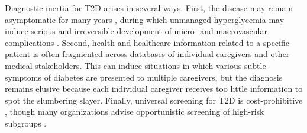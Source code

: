 Diagnostic inertia for T2D arises in several ways. First, the disease may remain asymptomatic for many years \citep{alberti1998report}, during which unmanaged hyperglycemia may induce serious and irreversible development of micro -and macrovascular complications \citep{fowler2008microvascular, beagley2014global}. 
Second, health and healthcare information related to a specific patient is often fragmented across databases of individual caregivers and other medical stakeholders. This can induce situations in which various subtle symptoms of diabetes are presented to multiple caregivers, but the diagnosis remains elusive because each individual caregiver receives too little information to spot the slumbering slayer.
Finally, universal screening for T2D is cost-prohibitive \citep{wareham2001should, engelgau2000screening}, though many organizations advise opportunistic screening of high-risk subgroups \citep{world1994prevention, alberti1998report, engelgau2000screening,american2014standards}.

